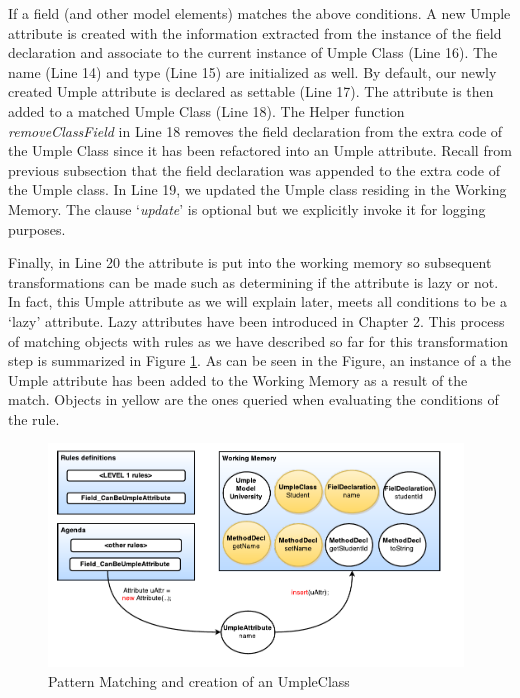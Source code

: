 If a field (and other model elements) matches the above conditions. A new Umple attribute is created with the information extracted from the instance of the field declaration and associate to the current instance of Umple Class (Line 16). The name (Line 14) and type (Line 15) are initialized as well. By default, our newly created Umple attribute is declared as settable (Line 17). The attribute is then added to a matched Umple Class (Line 18). The Helper function \textit{removeClassField} in Line 18 removes the field declaration from the extra code of the Umple Class since it has been refactored into an Umple attribute. Recall from previous subsection that the field declaration was appended to the extra code of the Umple class. In Line 19, we updated the Umple class residing in the Working Memory. The clause `\textit{update}' is optional but we explicitly invoke it for logging purposes.

Finally, in Line 20 the attribute is put into the working memory so subsequent transformations can be made such as determining if the attribute is lazy or not. In fact, this Umple attribute as we will explain later, meets all conditions to be a `lazy' attribute. Lazy attributes have been introduced in Chapter 2. This process of matching objects with rules as we have described so far for this transformation step is summarized in Figure \ref{fig:ruleModel3}. As can be seen in the Figure, an instance of a the Umple attribute has been added to the Working Memory as a result of the match. Objects in yellow are the ones queried when evaluating the conditions of the rule. 

\begin{figure}[h]
\centering
\includegraphics[width=0.98\textwidth]{Figures/ruleModel3.pdf}
\caption{Pattern Matching and creation of an UmpleClass}
\label{fig:ruleModel3}
\end{figure}

